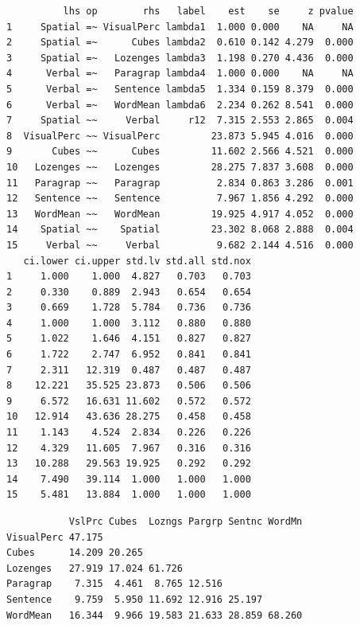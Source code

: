 \begin{verbatim}
          lhs op        rhs   label    est    se     z pvalue
1     Spatial =~ VisualPerc lambda1  1.000 0.000    NA     NA
2     Spatial =~      Cubes lambda2  0.610 0.142 4.279  0.000
3     Spatial =~   Lozenges lambda3  1.198 0.270 4.436  0.000
4      Verbal =~   Paragrap lambda4  1.000 0.000    NA     NA
5      Verbal =~   Sentence lambda5  1.334 0.159 8.379  0.000
6      Verbal =~   WordMean lambda6  2.234 0.262 8.541  0.000
7     Spatial ~~     Verbal     r12  7.315 2.553 2.865  0.004
8  VisualPerc ~~ VisualPerc         23.873 5.945 4.016  0.000
9       Cubes ~~      Cubes         11.602 2.566 4.521  0.000
10   Lozenges ~~   Lozenges         28.275 7.837 3.608  0.000
11   Paragrap ~~   Paragrap          2.834 0.863 3.286  0.001
12   Sentence ~~   Sentence          7.967 1.856 4.292  0.000
13   WordMean ~~   WordMean         19.925 4.917 4.052  0.000
14    Spatial ~~    Spatial         23.302 8.068 2.888  0.004
15     Verbal ~~     Verbal          9.682 2.144 4.516  0.000
   ci.lower ci.upper std.lv std.all std.nox
1     1.000    1.000  4.827   0.703   0.703
2     0.330    0.889  2.943   0.654   0.654
3     0.669    1.728  5.784   0.736   0.736
4     1.000    1.000  3.112   0.880   0.880
5     1.022    1.646  4.151   0.827   0.827
6     1.722    2.747  6.952   0.841   0.841
7     2.311   12.319  0.487   0.487   0.487
8    12.221   35.525 23.873   0.506   0.506
9     6.572   16.631 11.602   0.572   0.572
10   12.914   43.636 28.275   0.458   0.458
11    1.143    4.524  2.834   0.226   0.226
12    4.329   11.605  7.967   0.316   0.316
13   10.288   29.563 19.925   0.292   0.292
14    7.490   39.114  1.000   1.000   1.000
15    5.481   13.884  1.000   1.000   1.000
\end{verbatim}

\begin{Shaded}
\begin{Highlighting}[]
\OperatorTok{$}
\end{Highlighting}
\end{Shaded}

\begin{verbatim}
           VslPrc Cubes  Lozngs Pargrp Sentnc WordMn
VisualPerc 47.175                                   
Cubes      14.209 20.265                            
Lozenges   27.919 17.024 61.726                     
Paragrap    7.315  4.461  8.765 12.516              
Sentence    9.759  5.950 11.692 12.916 25.197       
WordMean   16.344  9.966 19.583 21.633 28.859 68.260
\end{verbatim}

